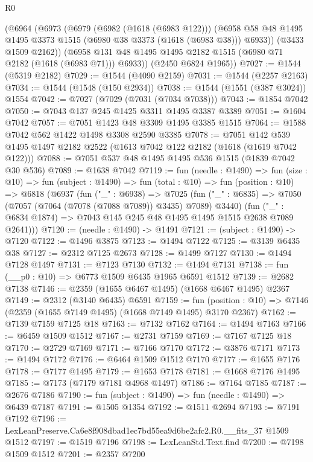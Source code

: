 \begin{lexlean}{R0}
\begin{coremodule}
      (@6964
        (@6973
          (@6979
            (@6982 (@1618 (@6983 @122)))
            (@6958 @58 @48 @1495 @1495 @3373 @1515 (@6980 @38 @3373 (@1618 (@6983 @38))) @6933))
          (@3433 @1509 @2162))
        (@6958 @131 @48 @1495 @1495 @2182 @1515 (@6980 @71 @2182 (@1618 (@6983 @71))) @6933))
      (@2450 @6824 @1965))
@7027 := @1544 (@5319 @2182)
@7029 := @1544 (@4090 @2159)
@7031 := @1544 (@2257 @2163)
@7034 := @1544 (@1548 (@150 @2934))
@7038 := @1544 (@1551 (@387 @3024)) @1554
@7042 := @7027 (@7029 (@7031 (@7034 @7038)))
@7043 := @1854 @7042
@7050 := @7043 @137 @245 @1425 @3311 @1495 @3387 @3389
@7051 := @1604 @7042
@7057 := @7051 @1423 @48 @3309 @1495 @3385 @1515
@7064 := @1588 @7042 @562 @1422 @1498 @3308 @2590 @3385
@7078 := @7051 @142 @539 @1495 @1497 @2182 @2522 (@1613 @7042 @122 @2182 (@1618 (@1619 @7042 @122)))
@7088 := @7051 @537 @48 @1495 @1495 @536 @1515 (@1839 @7042 @30 @536)
@7089 := @1638 @7042
@7119 := fun (needle : @1490) =>
  fun (size : @10) =>
  fun (subject : @1490) =>
  fun (total : @10) =>
  fun (position : @10) =>
  @6818
    (@6937
      (fun ("_" : @6938) =>
      @7025
        (fun ("_" : @6835) => @7050 (@7057 (@7064 (@7078 (@7088 @7089)) @3435) @7089) @3440)
        (fun ("_" : @6834 @1874) => @7043 @145 @245 @48 @1495 @1495 @1515 @2638 @7089 @2641)))
@7120 := (needle : @1490) -> @1491
@7121 := (subject : @1490) -> @7120
@7122 := @1496 @3875
@7123 := @1494 @7122
@7125 := @3139 @6435 @38
@7127 := @2312 @7125 @2673
@7128 := @1499 @7127
@7130 := @1494 @7128 @1497
@7131 := @7123 @7130
@7132 := @1494 @7131
@7138 := fun (__p0 : @10) => @6773 @1509 @6435 @1965 @6591 @1512
@7139 := @2682 @7138
@7146 := @2359 (@1655 @6467 @1495) (@1668 @6467 @1495) @2367
@7149 := @2312 (@3140 @6435) @6591
@7159 := fun (position : @10) => @7146 (@2359 (@1655 @7149 @1495) (@1668 @7149 @1495) @3170 @2367)
@7162 := @7139 @7159 @7125 @18
@7163 := @7132 @7162
@7164 := @1494 @7163
@7166 := @6459 @1509 @1512
@7167 := @2731 @7159
@7169 := @7167 @7125 @18
@7170 := @2729 @7169
@7171 := @7166 @7170
@7172 := @3876 @7171
@7173 := @1494 @7172
@7176 := @6464 @1509 @1512 @7170
@7177 := @1655 @7176
@7178 := @7177 @1495
@7179 := @1653 @7178
@7181 := @1668 @7176 @1495
@7185 := @7173 (@7179 @7181 @4968 @1497)
@7186 := @7164 @7185
@7187 := @2676 @7186
@7190 := fun (subject : @1490) => fun (needle : @1490) => @6439 @7187
@7191 := @1505 @1354
@7192 := @1511 @2694
@7193 := @7191 @7192
@7196 := LexLeanPreserve.Ca6e8f908dbad1ec7bd55ea9d6be2afc2.R0.__fits_37 @1509 @1512
@7197 := @1519 @7196
@7198 := LexLeanStd.Text.find
@7200 := @7198 @1509 @1512
@7201 := @2357 @7200

\end{coremodule}
\end{lexlean}
